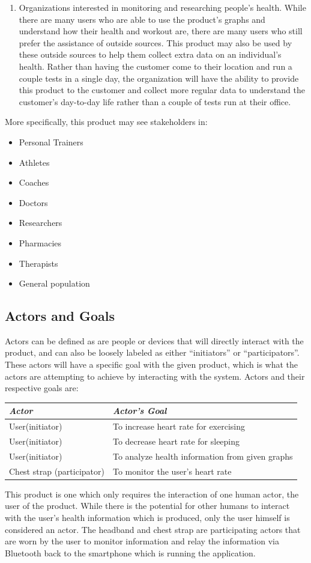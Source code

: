 \documentclass[letterpaper,english, 12pt]{scrreprt}
\begin{document}
\begin{enumerate}
	\item Organizations interested in monitoring and researching people’s health. While there are many users who are able to use the product’s graphs and understand how their health and workout are, there are many users who still prefer the assistance of outside sources. This product may also be used by these outside sources to help them collect extra data on an individual’s health. Rather than having the customer come to their location and run a couple tests in a single day, the organization will have the ability to provide this product to the customer and collect more regular data to understand the customer’s day-to-day life rather than a couple of tests run at their office.
\end{enumerate}

More specifically, this product may see stakeholders in:
\begin{itemize}
	\item Personal Trainers
	\item Athletes
	\item Coaches
	\item Doctors
	\item Researchers
	\item Pharmacies
	\item Therapists
	\item General population
\end{itemize}

\subsection{Actors and Goals}
Actors can be defined as are people or devices that will directly interact with the product, and can also be loosely labeled as either “initiators” or “participators”. These actors will have a specific goal with the given product, which is what the actors are attempting to achieve by interacting with the system. Actors and their respective goals are:
\begin{center}
	\begin{tabular}{|l|l|}
		\hline
		\emph{Actor} & \emph{Actor's Goal} \\\hline
		User(initiator)& To increase heart rate for exercising\\\hline
		User(initiator)& To decrease heart rate for sleeping\\\hline
		User(initiator)& To analyze health information from given graphs\\\hline
		Chest strap (participator)& To monitor the user's heart rate\\\hline
	\end{tabular}
\end{center}
This product is one which only requires the interaction of one human actor, the user of the product. While there is the potential for other humans to interact with the user’s health information which is produced, only the user himself is considered an actor. The headband and chest strap are participating actors that are worn by the user to monitor information and relay the information via Bluetooth back to the smartphone which is running the application.
\end{document}
